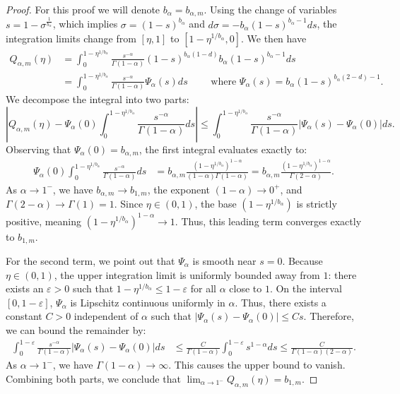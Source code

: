 \documentclass[a4paper]{article}
\theoremstyle{definition}
\begin{document}
\begin{proof}
  For this proof we will denote $b_\alpha = b_{\alpha,m}$. Using the change of variables $s = 1 - \sigma^{\frac{1}{b_\alpha}}$, which implies $\sigma = (1-s)^{b_\alpha}$ and $d\sigma = -b_\alpha(1-s)^{b_\alpha-1} ds$, the integration limits change from $[\eta, 1]$ to $[1 - \eta^{1/b_\alpha}, 0]$. We then have
  \begin{align*}
    Q_{\alpha,m}(\eta) & = \int_0^{1-\eta^{1/b_\alpha}} \frac{s^{-\alpha}}{\Gamma(1-\alpha)} (1-s)^{b_\alpha(1-d)} b_\alpha(1-s)^{b_\alpha-1} ds \\
    & = \int_0^{1-\eta^{1/b_\alpha}} \frac{s^{-\alpha}}{\Gamma(1-\alpha)} \Psi_\alpha(s) ds 
    \qquad \text{ where } \Psi_\alpha(s) = b_\alpha (1-s)^{b_\alpha(2-d)-1}.
  \end{align*}
  We decompose the integral into two parts:
  \begin{equation*}
    \left| Q_{\alpha,m} (\eta) - \Psi_\alpha(0) \int_0^{1-\eta^{1/b_\alpha}} \frac{s^{-\alpha}}{\Gamma(1-\alpha)} ds \right|
    \le
    \int_0^{1-\eta^{1/b_\alpha}}
    \frac{s^{-\alpha}}{\Gamma(1-\alpha)} \left| \Psi_\alpha(s) - \Psi_\alpha(0) \right|
    ds.
  \end{equation*}
  Observing that $\Psi_\alpha(0) = b_{\alpha,m}$, the first integral evaluates exactly to:
  \begin{align*}
    \Psi_\alpha(0) \int_0^{1-\eta^{1/b_\alpha}} \frac{s^{-\alpha}}{\Gamma(1-\alpha)} ds
    &=
    b_{\alpha,m} \frac{(1-\eta^{1/b_\alpha})^{1-\alpha}}{(1-\alpha)\Gamma(1-\alpha)}
    =
    b_{\alpha,m} \frac{(1-\eta^{1/b_\alpha})^{1-\alpha}}{\Gamma(2-\alpha)}.
  \end{align*}
  As $\alpha \to 1^-$, we have $b_{\alpha,m} \to b_{1,m}$, the exponent $(1-\alpha) \to 0^+$, and $\Gamma(2-\alpha) \to \Gamma(1) = 1$. Since $\eta \in (0,1)$, the base $(1-\eta^{1/b_\alpha})$ is strictly positive, meaning $(1-\eta^{1/b_\alpha})^{1-\alpha} \to 1$. Thus, this leading term converges exactly to $b_{1,m}$.

  For the second term, we point out that $\Psi_\alpha$ is smooth near $s=0$. Because $\eta \in (0,1)$, the upper integration limit is uniformly bounded away from $1$: there exists an $\varepsilon > 0$ such that $1-\eta^{1/b_\alpha} \le 1 - \varepsilon$ for all $\alpha$ close to $1$. On the interval $[0, 1-\varepsilon]$, $\Psi_\alpha$ is Lipschitz continuous uniformly in $\alpha$. Thus, there exists a constant $C > 0$ independent of $\alpha$ such that $|\Psi_\alpha(s) - \Psi_\alpha(0)| \le C s$.
  Therefore, we can bound the remainder by:
  \begin{align*}
    \int_0^{1-\varepsilon} \frac{s^{-\alpha}}{\Gamma(1-\alpha)} \left| \Psi_\alpha(s) - \Psi_\alpha(0) \right| ds
    & \le
    \frac{C}{\Gamma(1-\alpha)} \int_0^{1-\varepsilon} s^{1-\alpha} ds
    \le \frac{C}{\Gamma(1-\alpha)(2-\alpha)}.
  \end{align*}
  As $\alpha \to 1^-$, we have $\Gamma(1-\alpha) \to \infty$. This causes the upper bound to vanish. Combining both parts, we conclude that $\lim_{\alpha \to 1^-} Q_{\alpha,m}(\eta) = b_{1,m}$.
\end{proof}
\end{document}
